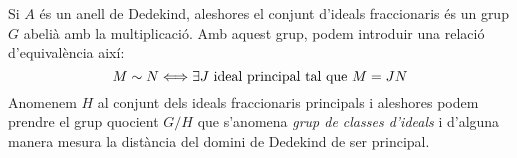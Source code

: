 \documentclass[../../../main.tex]{subfiles}
\begin{document}
\begin{nota}
Si $A$ és un anell de Dedekind, aleshores el conjunt d'ideals fraccionaris és un grup $G$ abelià amb la multiplicació. Amb aquest grup, podem introduir una relació d'equivalència així:
\begin{equation}
    \notag
    M\sim N\Longleftrightarrow \text{$\exists J$ ideal principal tal que $M=JN$}
\end{equation}
Anomenem $H$ al conjunt dels ideals fraccionaris principals i aleshores podem prendre el grup quocient $G/H$ que s'anomena \textit{grup de classes d'ideals}  i d'alguna manera mesura la distància del domini de Dedekind de ser principal.
\end{nota}
\end{document}
